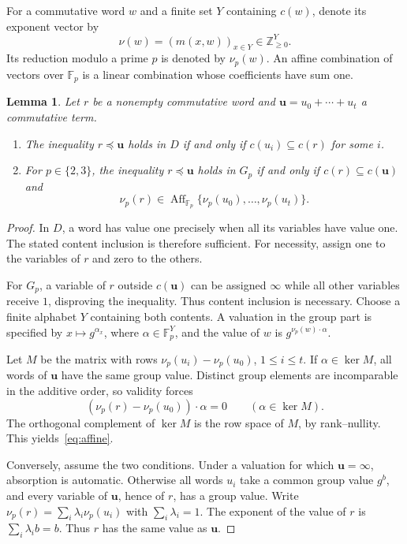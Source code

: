 \documentclass[11pt,reqno]{amsart}
\newtheorem{lemma}[theorem]{Lemma}
\theoremstyle{remark}
\newcommand{\F}{\mathbb F}
\newcommand{\bu}{\mathbf u}
\DeclareMathOperator{\Aff}{Aff}
\numberwithin{equation}{section}
\begin{document}
For a commutative word $w$ and a finite set $Y$ containing $c(w)$, denote
its exponent vector by
\[
\nu(w)=(m(x,w))_{x\in Y}\in\mathbb Z_{\geq0}^{Y}.
\]
Its reduction modulo a prime $p$ is denoted by $\nu_p(w)$. An affine
combination of vectors over $\F_p$ is a linear combination whose
coefficients have sum one.

\begin{lemma}\label{lem:characterization}
Let $r$ be a nonempty commutative word and
$\bu=u_0+\cdots+u_t$ a commutative term.
\begin{enumerate}
\item The inequality $r\preceq\bu$ holds in $D$ if and only if
$c(u_i)\subseteq c(r)$ for some $i$.
\item For $p\in\{2,3\}$, the inequality $r\preceq\bu$ holds in $G_p$
if and only if $c(r)\subseteq c(\bu)$ and
\begin{equation}\label{eq:affine}
\nu_p(r)\in\Aff_{\F_p}\{\nu_p(u_0),\ldots,\nu_p(u_t)\}.
\end{equation}
\end{enumerate}
\end{lemma}
\begin{proof}
In $D$, a word has value one precisely when all its variables have value
one. The stated content inclusion is therefore sufficient. For necessity,
assign one to the variables of $r$ and zero to the others.

For $G_p$, a variable of $r$ outside $c(\bu)$ can be assigned $\infty$
while all other variables receive $1$, disproving the inequality. Thus
content inclusion is necessary. Choose a finite alphabet $Y$ containing
both contents. A valuation in the group part is specified by
$x\mapsto g^{\alpha_x}$, where $\alpha\in\F_p^Y$, and the value of $w$
is $g^{\nu_p(w)\cdot\alpha}$.

Let $M$ be the matrix with rows $\nu_p(u_i)-\nu_p(u_0)$,
$1\leq i\leq t$. If $\alpha\in\ker M$, all words of $\bu$ have the
same group value. Distinct group elements are incomparable in the additive
order, so validity forces
\[
(\nu_p(r)-\nu_p(u_0))\cdot\alpha=0\qquad(\alpha\in\ker M).
\]
The orthogonal complement of $\ker M$ is the row space of $M$, by
rank--nullity. This yields~\eqref{eq:affine}.

Conversely, assume the two conditions. Under a valuation for which
$\bu=\infty$, absorption is automatic. Otherwise all words $u_i$ take a
common group value $g^b$, and every variable of $\bu$, hence of $r$,
has a group value. Write $\nu_p(r)=\sum_i\lambda_i\nu_p(u_i)$ with
$\sum_i\lambda_i=1$. The exponent of the value of $r$ is
$\sum_i\lambda_i b=b$. Thus $r$ has the same value as $\bu$.
\end{proof}
\end{document}

